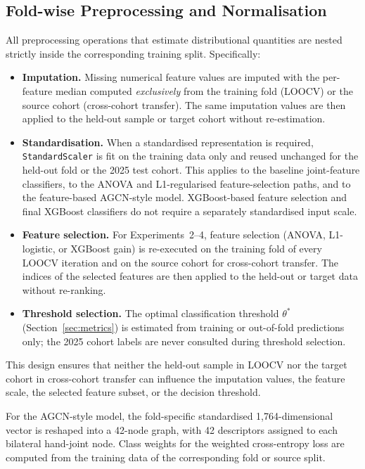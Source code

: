 \subsection{Fold-wise Preprocessing and Normalisation}
\label{sec:fold_preprocess}

All preprocessing operations that estimate distributional quantities are nested strictly inside the corresponding training split. Specifically:

\begin{itemize}
    \item \textbf{Imputation.} Missing numerical feature values are imputed with the per-feature median computed \emph{exclusively} from the training fold (LOOCV) or the source cohort (cross-cohort transfer). The same imputation values are then applied to the held-out sample or target cohort without re-estimation.
    \item \textbf{Standardisation.} When a standardised representation is required, \texttt{StandardScaler} is fit on the training data only and reused unchanged for the held-out fold or the 2025 test cohort. This applies to the baseline joint-feature classifiers, to the ANOVA and L1-regularised feature-selection paths, and to the feature-based AGCN-style model. XGBoost-based feature selection and final XGBoost classifiers do not require a separately standardised input scale.
    \item \textbf{Feature selection.} For Experiments~2--4, feature selection (ANOVA, L1-logistic, or XGBoost gain) is re-executed on the training fold of every LOOCV iteration and on the source cohort for cross-cohort transfer. The indices of the selected features are then applied to the held-out or target data without re-ranking.
    \item \textbf{Threshold selection.} The optimal classification threshold $\theta^{*}$ (Section~\ref{sec:metrics}) is estimated from training or out-of-fold predictions only; the 2025 cohort labels are never consulted during threshold selection.
\end{itemize}

This design ensures that neither the held-out sample in LOOCV nor the target cohort in cross-cohort transfer can influence the imputation values, the feature scale, the selected feature subset, or the decision threshold.

For the AGCN-style model, the fold-specific standardised 1,764-dimensional vector is reshaped into a 42-node graph, with 42 descriptors assigned to each bilateral hand-joint node. Class weights for the weighted cross-entropy loss are computed from the training data of the corresponding fold or source split.

